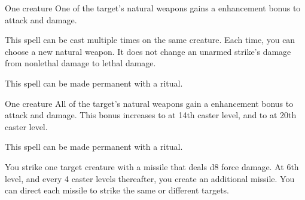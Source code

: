 \begin{spellheader}
    \spellrng{\rngclose}
    \spelldur{\durshort}
\end{spellheader}
\begin{spelleffects}
    \begin{spelltarget}{One creature}
        \spelleffect One of the target's natural weapons gains a  enhancement bonus to attack and damage. \spellbonusscalingdescription
    \end{spelltarget}
\end{spelleffects}
\begin{spellfooter}
    \spellnotes This spell can be cast multiple times on the same creature. Each time, you can choose a new natural weapon. It does not change an unarmed strike's damage from nonlethal damage to lethal damage.

    This spell can be made permanent with a  ritual.
\end{spellfooter}

\begin{spellheader}
    \spellrng{\rngclose}
    \spelldur{\durshort}
\end{spellheader}
\begin{spelleffects}
    \begin{spelltarget}{One creature}
        \spelleffect All of the target's natural weapons gain a  enhancement bonus to attack and damage. This bonus increases to  at 14th caster level, and to  at 20th caster level.
    \end{spelltarget}
\end{spelleffects}
\begin{spellfooter}
    \spellnotes This spell can be made permanent with a  ritual.
\end{spellfooter}

\begin{spellheader}
\end{spellheader}
\begin{spelleffects}
    \spelleffect You strike one target creature with a missile that deals d8 force damage. At 6th level, and every 4 caster levels thereafter, you create an additional missile. You can direct each missile to strike the same or different targets.
\end{spelleffects}
\begin{spellfooter}
    [Force] \forcespellnotes
\end{spellfooter}


